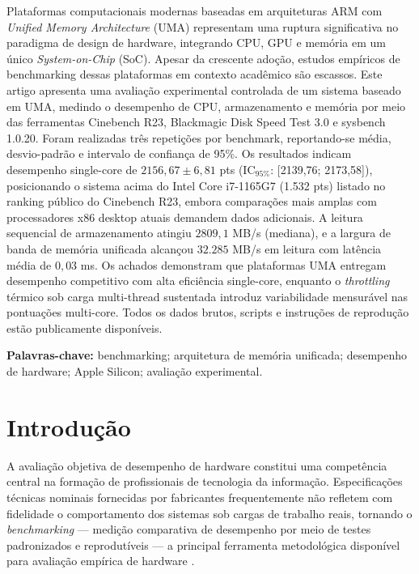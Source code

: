 \documentclass[12pt]{article}
\begin{document}
\begin{resumo}
  Plataformas computacionais modernas baseadas em arquiteturas ARM com
  \textit{Unified Memory Architecture} (UMA) representam uma ruptura
  significativa no paradigma de design de hardware, integrando CPU, GPU e
  mem\'oria em um \'unico \textit{System-on-Chip} (SoC). Apesar da crescente
  ado\c{c}\~ao, estudos emp\'iricos de benchmarking dessas plataformas em
  contexto acad\^emico s\~ao escassos. Este artigo apresenta uma avalia\c{c}\~ao
  experimental controlada de um sistema baseado em UMA, medindo o desempenho
  de CPU, armazenamento e mem\'oria por meio das ferramentas Cinebench R23,
  Blackmagic Disk Speed Test 3.0 e sysbench 1.0.20. Foram realizadas tr\^es
  repeti\c{c}\~oes por benchmark, reportando-se m\'edia, desvio-padr\~ao e
  intervalo de confian\c{c}a de 95\%. Os resultados indicam desempenho
  single-core de $2156{,}67 \pm 6{,}81$ pts (IC$_{95\%}$: [2139,76;
  2173,58]), posicionando o sistema acima do Intel Core i7-1165G7 (1.532 pts)
  listado no ranking p\'ublico do Cinebench R23, embora compara\c{c}\~oes mais
  amplas com processadores x86 desktop atuais demandem dados adicionais.
  A leitura sequencial de
  armazenamento atingiu $2809{,}1$ MB/s (mediana), e a largura de banda de
  mem\'oria unificada alcan\c{c}ou $32.285$ MB/s em leitura com lat\^encia
  m\'edia de $0{,}03$ ms. Os achados demonstram que plataformas UMA entregam
  desempenho competitivo com alta efici\^encia single-core, enquanto o
  \textit{throttling} t\'ermico sob carga multi-thread sustentada introduz
  variabilidade mensur\'avel nas pontua\c{c}\~oes multi-core. Todos os dados
  brutos, scripts e instru\c{c}\~oes de reprodu\c{c}\~ao est\~ao
  publicamente dispon\'iveis.
\end{resumo}

\noindent\textbf{Palavras-chave:} benchmarking; arquitetura de mem\'oria
unificada; desempenho de hardware; Apple Silicon; avalia\c{c}\~ao experimental.


\section{Introdu\c{c}\~ao}

A avalia\c{c}\~ao objetiva de desempenho de hardware constitui uma
compet\^encia central na forma\c{c}\~ao de profissionais de tecnologia da
informa\c{c}\~ao. Especifica\c{c}\~oes t\'ecnicas nominais fornecidas por
fabricantes frequentemente n\~ao refletem com fidelidade o comportamento dos
sistemas sob cargas de trabalho reais, tornando o \textit{benchmarking} ---
medi\c{c}\~ao comparativa de desempenho por meio de testes padronizados e
reprodut\'iveis --- a principal ferramenta metodol\'ogica dispon\'ivel para
avalia\c{c}\~ao emp\'irica de hardware \cite{lilja2005measuring}.
\end{document}
